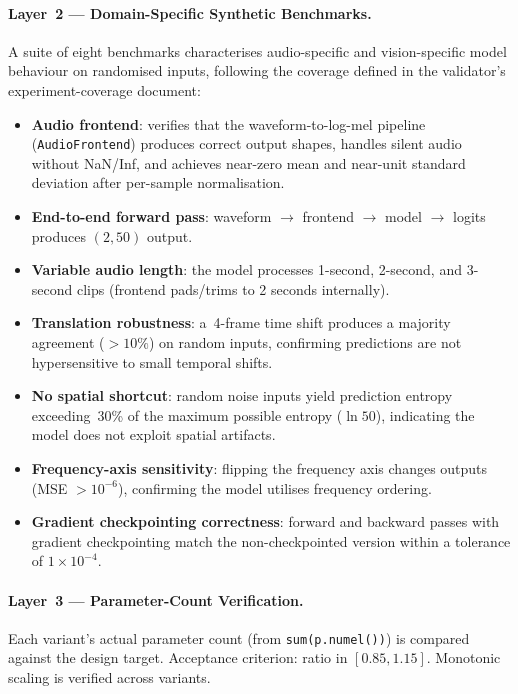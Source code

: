 \documentclass{article}
\begin{document}
\paragraph{Layer~2 --- Domain-Specific Synthetic Benchmarks.}
A suite of eight benchmarks characterises audio-specific and vision-specific
model behaviour on randomised inputs, following the coverage defined in the
validator's experiment-coverage document:
\begin{itemize}
  \item \textbf{Audio frontend}: verifies that the waveform-to-log-mel pipeline
  (\texttt{AudioFrontend}) produces correct output shapes, handles silent audio
  without NaN/Inf, and achieves near-zero mean and near-unit standard deviation
  after per-sample normalisation.
  \item \textbf{End-to-end forward pass}: waveform $\rightarrow$ frontend
  $\rightarrow$ model $\rightarrow$ logits produces $(2, 50)$ output.
  \item \textbf{Variable audio length}: the model processes 1-second, 2-second,
  and 3-second clips (frontend pads/trims to 2 seconds internally).
  \item \textbf{Translation robustness}: a~4-frame time shift produces a
  majority agreement ($>10\%$) on random inputs, confirming predictions are not
  hypersensitive to small temporal shifts.
  \item \textbf{No spatial shortcut}: random noise inputs yield prediction
  entropy exceeding~30\% of the maximum possible entropy ($\ln 50$), indicating
  the model does not exploit spatial artifacts.
  \item \textbf{Frequency-axis sensitivity}: flipping the frequency axis changes
  outputs (MSE $> 10^{-6}$), confirming the model utilises frequency ordering.
  \item \textbf{Gradient checkpointing correctness}: forward and backward passes
  with gradient checkpointing match the non-checkpointed version within a
  tolerance of $1\times10^{-4}$.
\end{itemize}

\paragraph{Layer~3 --- Parameter-Count Verification.}
Each variant's actual parameter count (from \texttt{sum(p.numel())}) is
compared against the design target. Acceptance criterion: ratio in $[0.85, 1.15]$.
Monotonic scaling is verified across variants.
\end{document}
